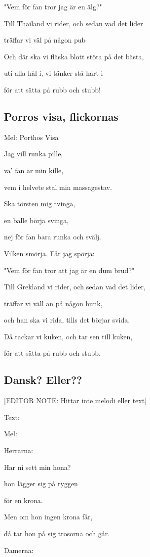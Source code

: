 "Vem för fan tror jag är en älg?"

Till Thailand vi rider, och sedan vad det lider

träffar vi väl på någon pub

Och där ska vi fläska blott stöta på det bästa,

uti alla hål i, vi tänker stå hårt i

för att sätta på rubb och stubb!

\subsection{\textbf{Porros visa, flickornas}}

Mel: Porthos Visa\bigskip

Jag vill runka pille,

va’ fan är min kille,

vem i helvete stal min massagestav.

Ska törsten mig tvinga,

en balle börja svinga,

nej för fan bara runka och svälj.

Vilken smörja. Får jag spörja:

"Vem för fan tror att jag är en dum brud?"

Till Grekland vi rider, och sedan vad det lider,

träffar vi väll an på någon hunk,

och han ska vi rida, tills det 
börjar svida.

Då tackar vi kuken, och tar sen till kuken,

för att sätta på rubb och stubb. 


\subsection{\textbf{Dansk? Eller??}}

[EDITOR NOTE: Hittar inte melodi eller text]

Text: 

Mel: \bigskip

Herrarna:

Har ni sett min hona?

hon lägger sig på ryggen

för en krona.

Men om hon ingen krona får,

då tar hon på sig trosorna och går.\bigskip

Damerna:

